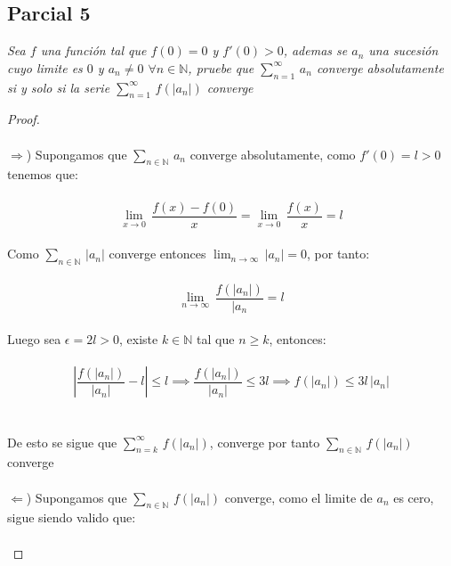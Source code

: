 \documentclass[11pt,letterpaper]{article}
\newcommand{\N}{\mathbb{N}}
\begin{document}
\subsection*{Parcial 5}
\begin{tcolorbox}[
	title = \textcolor{black}{\textcolor{white}{Parcial 5}},]
\textit{Sea $f$ una funci\'on tal que $f(0)=0$ y $f'(0)>0$, ademas se $a_n$ una sucesi\'on cuyo limite es $0$ y $a_n\neq 0$ $\forall n\in \N$, pruebe que $\sum_{n=1}^{\infty}\,a_n$ converge absolutamente si y solo si
la serie $\sum_{n=1}^{\infty}\,f(|a_n|)$ converge}
\end{tcolorbox}
\begin{proof}\,\\
    \,\\
    $\Rightarrow$)\,\,Supongamos que $\sum_{n\in \N}\,a_n$ converge absolutamente, como $f'(0)=l>0$ tenemos que:\,\\
    \,\\
    \begin{equation*}
        \lim_{x\rightarrow 0}\,\frac{f(x)-f(0)}{x}=\lim_{x\rightarrow 0}\,\frac{f(x)}{x}=l
    \end{equation*}\,\\
    Como $\sum_{n\in \N}\,|a_n|$ converge entonces $\lim_{n\rightarrow \infty}\,|a_n|=0$, por tanto:\,\\
    \,\\
    \begin{equation*}
        \lim_{n\rightarrow \infty}\,\frac{f(|a_n|)}{|a_n}=l
    \end{equation*}\,\\
    Luego sea $\epsilon=2l>0$, existe $k\in \N$ tal que $n\geq k$, entonces:\,\\
    \,\\
    \begin{equation*}
        \left|\frac{f(|a_n|)}{|a_n|}-l\right|\leq l\implies \frac{f(|a_n|)}{|a_n|}\leq 3l\implies f(|a_n|)\leq 3l\,|a_n|
    \end{equation*}\,\\
    \,\\
    De esto se sigue que $\sum_{n=k}^{\infty}\,f(|a_n|)$, converge por tanto $\sum_{n\in \N}\,f(|a_n|)$ converge\,\\
    \newpage
    \,\\
    $\Leftarrow$) Supongamos que $\sum_{n\in \N}\,f(|a_n|)$ converge, como el limite de $a_n$ es cero, sigue siendo valido que:\,\\
    \,\\

\end{proof}
\end{document}
